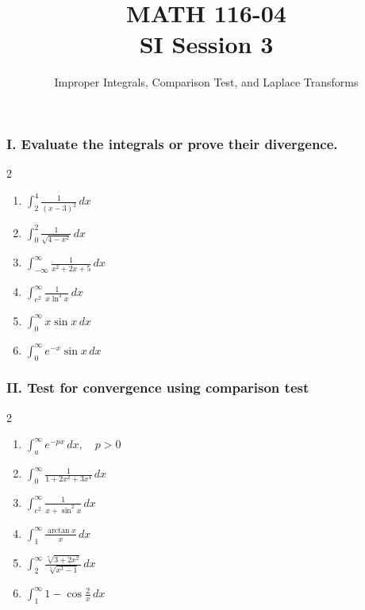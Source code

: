 \documentclass[12pt]{article}
\begin{document}

\title{MATH 116-04 \\ SI Session 3}
\author{ Improper Integrals, Comparison Test, and Laplace Transforms}

\maketitle

\subsubsection*{I. Evaluate the integrals or prove their divergence.}

\begin{multicols}{2}
\begin{enumerate}
    \item $\displaystyle \int_{2}^{4} \frac{1}{(x-3)^2}\, dx$
    \item $\displaystyle \int_{0}^{2} \frac{1}{\sqrt{4-x^2}}\, dx$
    \item $\displaystyle \int_{-\infty}^{\infty} \frac{1}{x^2+2x+5}\, dx$
    \item $\displaystyle \int_{e^2}^{\infty} \frac{1}{x\ln^3{x}} \, dx$
    \item $\displaystyle \int_{0}^{\infty} x\sin{x} \, dx$
    \item $\displaystyle \int_{0}^{\infty} e^{-x}\sin{x} \, dx$
\end{enumerate}
\end{multicols}


\subsubsection*{II. Test for convergence using comparison test}
\begin{multicols}{2}
\begin{enumerate}
    \item $\displaystyle \int_{a}^{\infty} e^{-px}\, dx, \quad p>0$
    \item $\displaystyle \int_{0}^{\infty} \frac{1}{1+2x^2+3x^4}\, dx$
    \item $\displaystyle \int_{e^2}^{\infty} \frac{1}{x+\sin^2x} \, dx$
    \item $\displaystyle \int_{1}^{\infty} \frac{\arctan{x}}{x}\, dx$
    \item $\displaystyle \int_{2}^{\infty} \frac{\sqrt[7]{3+2x^2}}{\sqrt[5]{x^3-1}}\, dx$
    \item $\displaystyle \int_{1}^{\infty} 1- \cos{\frac{2}{x}} \, dx$
\end{enumerate}
\end{multicols}
\end{document}
